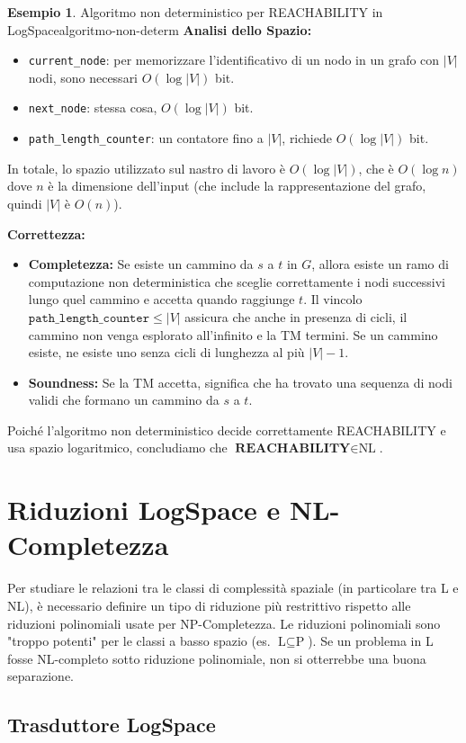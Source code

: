 \documentclass[a4paper]{article}
\theoremstyle{definition} %
\newtheorem{example}{Esempio}[section]
\begin{document}
\begin{example}{Algoritmo non deterministico per REACHABILITY in LogSpace}{algoritmo-non-determ}
\textbf{Analisi dello Spazio:}
\begin{itemize}
    \item \texttt{current\_node}: per memorizzare l'identificativo di un nodo in un grafo con $|V|$ nodi, sono necessari $O(\log |V|)$ bit.
    \item \texttt{next\_node}: stessa cosa, $O(\log |V|)$ bit.
    \item \texttt{path\_length\_counter}: un contatore fino a $|V|$, richiede $O(\log |V|)$ bit.
\end{itemize}
In totale, lo spazio utilizzato sul nastro di lavoro è $O(\log |V|)$, che è $O(\log n)$ dove $n$ è la dimensione dell'input (che include la rappresentazione del grafo, quindi $|V|$ è $O(n)$).

\textbf{Correttezza:}
\begin{itemize}
    \item \textbf{Completezza:} Se esiste un cammino da $s$ a $t$ in $G$, allora esiste un ramo di computazione non deterministica che sceglie correttamente i nodi successivi lungo quel cammino e accetta quando raggiunge $t$. Il vincolo $\texttt{path\_length\_counter} \leq |V|$ assicura che anche in presenza di cicli, il cammino non venga esplorato all'infinito e la TM termini. Se un cammino esiste, ne esiste uno senza cicli di lunghezza al più $|V|-1$.
    \item \textbf{Soundness:} Se la TM accetta, significa che ha trovato una sequenza di nodi validi che formano un cammino da $s$ a $t$.
\end{itemize}
Poiché l'algoritmo non deterministico decide correttamente REACHABILITY e usa spazio logaritmico, concludiamo che $\textbf{REACHABILITY} \in \text{NL}$.
\end{example}

\section{Riduzioni LogSpace e NL-Completezza}

Per studiare le relazioni tra le classi di complessità spaziale (in particolare tra L e NL), è necessario definire un tipo di riduzione più restrittivo rispetto alle riduzioni polinomiali usate per NP-Completezza. Le riduzioni polinomiali sono "troppo potenti" per le classi a basso spazio (es. $\text{L} \subseteq \text{P}$). Se un problema in L fosse NL-completo sotto riduzione polinomiale, non si otterrebbe una buona separazione.

\subsection{Trasduttore LogSpace}
\end{document}
